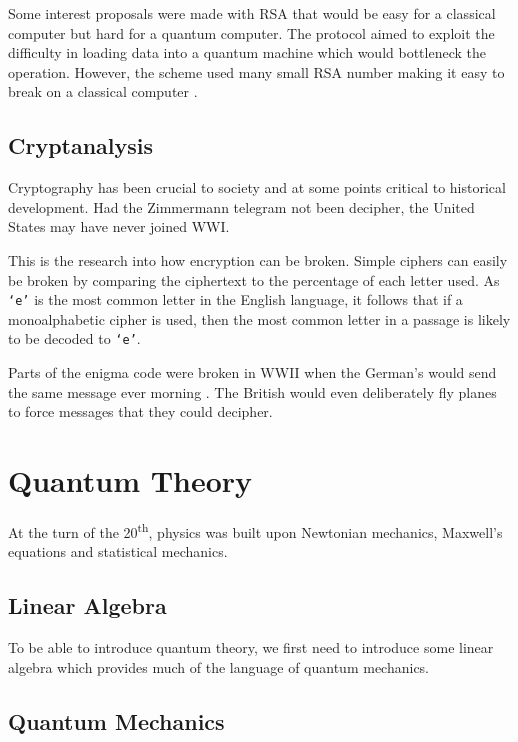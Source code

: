 Some interest proposals were made with RSA that would be easy for a classical computer but hard for a quantum computer. The protocol aimed to exploit the difficulty in loading data into a quantum machine which would bottleneck the operation. However, the scheme used many small RSA number making it easy to break on a classical computer .

\subsection{Cryptanalysis}
\label{sec1:cryptanalysis}

Cryptography has been crucial to society and at some points critical to historical development. Had the Zimmermann telegram not been decipher, the United States may have never joined WWI.

This is the research into how encryption can be broken. Simple ciphers can easily be broken by comparing the ciphertext to the percentage of each letter used. As \texttt{`e'} is the most common letter in the English language, it follows that if a monoalphabetic cipher is used, then the most common letter in a passage is likely to be decoded to \texttt{`e'}.

Parts of the enigma code were broken in WWII when the German's would send the same message ever morning \cite{hodges2012alan}. The British would even deliberately fly planes to force messages that they could decipher.

\section{Quantum Theory}

At the turn of the 20\textsuperscript{th}, physics was built upon Newtonian mechanics, Maxwell's equations and statistical mechanics. 

\subsection{Linear Algebra}

To be able to introduce quantum theory, we first need to introduce some linear algebra which provides much of the language of quantum mechanics.

\subsection{Quantum Mechanics}

